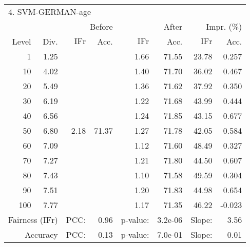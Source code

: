 \begin{tabular}{rr||rr|rr|rr}
\multicolumn{4}{l}{4. SVM-GERMAN-age} & \multicolumn{2}{c}{} & \multicolumn{2}{c}{}\\
 &  & \multicolumn{2}{r|}{Before} & \multicolumn{2}{r|}{After} & \multicolumn{2}{r}{Impr. (\%)}\\
Level & Div. & $\mathrm{IFr}$ & Acc. & $\mathrm{IFr}$ & Acc. & $\mathrm{IFr}$ & Acc.\\
\hline
1 & 1.25 & \multirow{11}{*}{2.18} & \multirow{11}{*}{71.37} & 1.66 & 71.55 & 23.78 & 0.257\\
10 & 4.02 &  &  & 1.40 & 71.70 & 36.02 & 0.467\\
20 & 5.49 &  &  & 1.36 & 71.62 & 37.92 & 0.350\\
30 & 6.19 &  &  & 1.22 & 71.68 & 43.99 & 0.444\\
40 & 6.56 &  &  & 1.24 & 71.85 & 43.15 & 0.677\\
50 & 6.80 &  &  & 1.27 & 71.78 & 42.05 & 0.584\\
60 & 7.09 &  &  & 1.12 & 71.60 & 48.49 & 0.327\\
70 & 7.27 &  &  & 1.21 & 71.80 & 44.50 & 0.607\\
80 & 7.43 &  &  & 1.10 & 71.58 & 49.59 & 0.304\\
90 & 7.51 &  &  & 1.20 & 71.83 & 44.98 & 0.654\\
100 & 7.77 &  &  & 1.17 & 71.35 & 46.22 & -0.023\\
\hline
\multicolumn{2}{r}{Fairness ($\mathrm{IFr}$)} & PCC: & \multicolumn{1}{r}{0.96} & p-value:  & \multicolumn{1}{r}{3.2e-06} & Slope:  & 3.56\\
\multicolumn{2}{r}{Accuracy} & PCC: & \multicolumn{1}{r}{0.13} & p-value:  & \multicolumn{1}{r}{7.0e-01} & Slope:  & 0.01\\
\end{tabular}